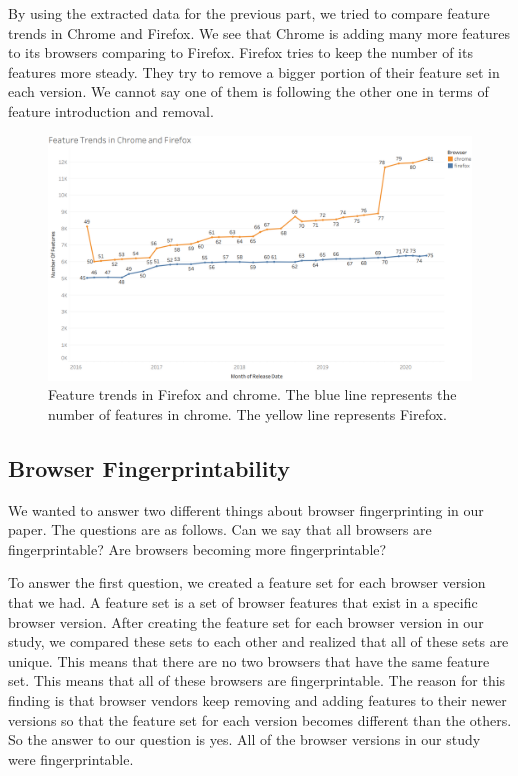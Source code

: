 By using the extracted data for the previous part, we tried to compare feature trends in Chrome and Firefox. We see that Chrome is adding many more features to its browsers comparing to Firefox. Firefox tries to keep the number of its features more steady. They try to remove a bigger portion of their feature set in each version. We cannot say one of them is following the other one in terms of feature introduction and removal.

\begin{figure}[ht]
    \centering
    \includegraphics[width=\columnwidth]{figures/Feature-Trends.PNG}
    \caption{Feature trends in Firefox and chrome. The blue line represents the number of features in chrome. The yellow line represents Firefox.}
    \label{fig:times_bar}
\end{figure}



\subsection{Browser Fingerprintability}
We wanted to answer two different things about browser fingerprinting in our paper. The questions are as follows. Can we say that all browsers are fingerprintable? Are browsers becoming more fingerprintable?

To answer the first question, we created a feature set for each browser version that we had. A feature set is a set of browser features that exist in a specific browser version. After creating the feature set for each browser version in our study, we compared these sets to each other and realized that all of these sets are unique. This means that there are no two browsers that have the same feature set. This means that all of these browsers are fingerprintable. The reason for this finding is that browser vendors keep removing and adding features to their newer versions so that the feature set for each version becomes different than the others. So the answer to our question is yes. All of the browser versions in our study were fingerprintable.



